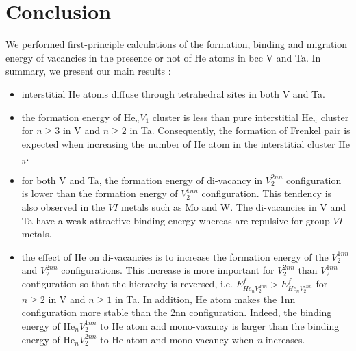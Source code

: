 \documentclass[a4,12pt,showpacs,preprintnumbers,amsmath,amssymb]{revtex4}
\newcommand{\MCM}[1]{\noindent{\marginpar{\bf \tiny MCM} \bf  #1 }}
\begin{document}
\section{Conclusion}

We performed first-principle calculations of the formation, binding and migration energy of vacancies 
in the presence or not of He atoms in bcc V and Ta.
In summary, we present our main results :
\begin{itemize}
 \item interstitial He atoms diffuse through tetrahedral sites in both V and Ta.
 
 \item the formation energy of He$_nV_1$ cluster is less than pure interstitial He$_n$ cluster for $n\ge3$ in V 
 and $n\ge2$ in Ta. Consequently, the formation of Frenkel pair is expected when increasing the number of He atom 
 in the interstitial cluster He$_n$.
 
 
 \item  for both V and Ta, the formation energy of di-vacancy in $V_2^{2nn}$ configuration  is  lower than 
 the formation energy of $V_2^{1nn}$ configuration. 
 This tendency is also observed in the $VI$ metals such as Mo and W. 
 The di-vacancies in V and Ta have a weak attractive binding energy whereas are repulsive for group $VI$ metals.
 
 \item the effect of He on di-vacancies is to increase the formation energy of the $V_2^{1nn}$ and $V_2^{2nn}$ configurations.
 This increase is more important for $V_2^{2nn}$ than $V_2^{1nn}$ configuration so that the hierarchy is reversed, i.e. 
 $E^f_{He_nV_2^{2nn}} > E^f_{He_nV_2^{1nn}}$ for $n \ge 2$ in V and $n \ge 1$ in Ta. 
 In addition, He atom makes the 1nn configuration more 
 stable than the 2nn configuration. Indeed, the binding energy of He$_{n}V_{2}^{1nn}$ to He atom and mono-vacancy is larger than 
 the binding energy of He$_{n}V_{2}^{2nn}$ to He atom and mono-vacancy when \textit{n} increases.
 

\end{itemize}
\end{document}
